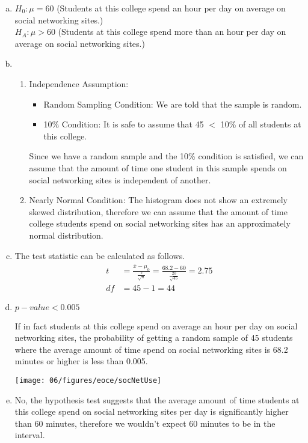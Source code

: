 {
\begin{enumerate}[(a)]
\setlength{\itemsep}{0mm}
\item $H_0: \mu = 60$ (Students at this college spend an hour per day on average on social networking sites.) \\
$H_A: \mu > 60$ (Students at this college spend more than an hour per day on average on social networking sites.)
\item 
\begin{enumerate}[1.]
\item Independence Assumption: 
\begin{itemize}
\item Random Sampling Condition: We are told that the sample is random.
\item 10\% Condition: It is safe to assume that 45 $<$ 10\% of all students at this college.
\end{itemize}
Since we have a random sample and the 10\% condition is satisfied, we can assume that the amount of time one student in this sample spends on social networking sites is independent of another.
\item Nearly Normal Condition: The histogram does not show an extremely skewed distribution, therefore we can assume that the amount of time college students spend on social networking sites has an approximately normal distribution.
\end{enumerate}
\item The test statistic can be calculated as follows.
\begin{align*}
t &= \frac{\bar{x} - \mu_0}{\frac{s}{\sqrt{n}}} = \frac{68.2 - 60}{\frac{20}{\sqrt{45}}} = 2.75\\
df &= 45 - 1 = 44
\end{align*}
\item $p-value < 0.005$ \\
\begin{minipage}[c]{0.5\textwidth}
If in fact students at this college spend on average an hour per day on social networking sites, the probability of getting a random sample of 45 students where the average amount of time spend on social networking sites is 68.2 minutes or higher is less than 0.005.
\end{minipage}
\begin{minipage}[c]{0.5\textwidth}
\begin{center}
\texttt{[image: 06/figures/eoce/socNetUse]}
\end{center}
\end{minipage}
\item No, the hypothesis test suggests that the average amount of time students at this college spend on social networking sites per day is significantly higher than 60 minutes, therefore we wouldn't expect 60 minutes to be in the interval.
\end{enumerate}
}\label{socNetUse}

